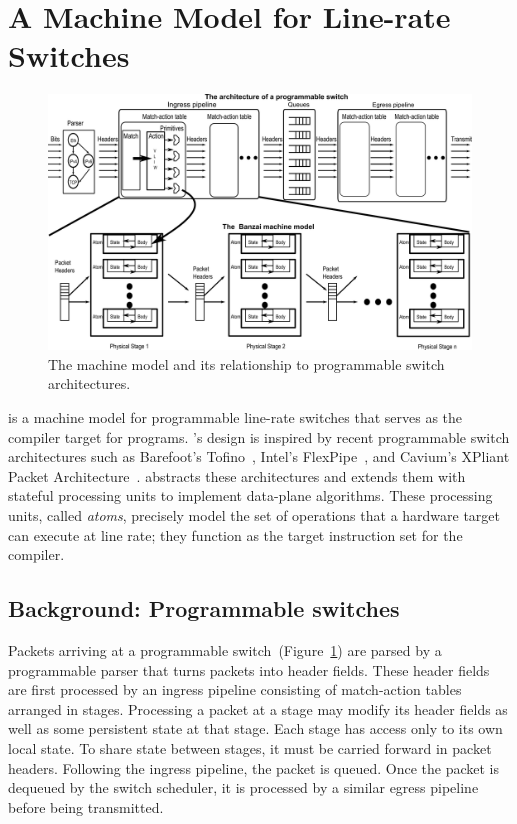 \section{A Machine Model for Line-rate Switches}
\label{s:absmachine}
\begin{figure}[!t]
  \includegraphics[width=\textwidth]{banzai.pdf}
  \caption{The \absmachine machine model and its relationship to
  programmable switch architectures.}
  \label{fig:switch}
\end{figure}

\absmachine is a machine model for programmable line-rate switches
that serves as the compiler target for \pktlanguage programs.
\absmachine's design is inspired by recent programmable switch
architectures such as Barefoot's Tofino~\cite{tofino}, Intel's
FlexPipe~\cite{flexpipe}, and Cavium's XPliant Packet
Architecture~\cite{xpliant}. \absmachine abstracts these architectures
and extends them with stateful processing units to implement
data-plane algorithms. These processing units, called {\em atoms},
precisely model the set of operations that a hardware target can
execute at line rate; they function as the target instruction set for
the \pktlanguage compiler.

\subsection{Background: Programmable switches}
Packets arriving at a programmable switch~(Figure~\ref{fig:switch}) are parsed
by a programmable parser that turns packets into header fields. These header
fields are first processed by an ingress pipeline consisting of match-action
tables arranged in stages. Processing a packet at a stage may modify its header
fields as well as some persistent state at that stage. Each stage has access
only to its own local state. To share state between stages, it must be carried
forward in packet headers. Following the ingress pipeline, the packet is
queued. Once the packet is dequeued by the switch scheduler, it is processed by
a similar egress pipeline before being transmitted.

